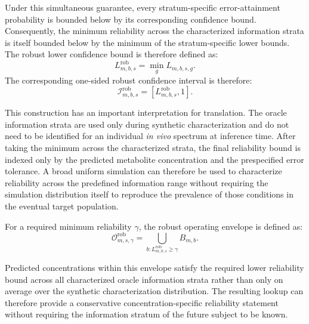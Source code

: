 Under this simultaneous guarantee, every stratum-specific error-attainment probability is bounded below by its corresponding confidence bound. Consequently, the minimum reliability across the characterized information strata is itself bounded below by the minimum of the stratum-specific lower bounds. The robust lower confidence bound is therefore defined as:
\begin{equation}
    L_{m,b,s}^{\mathrm{rob}} = \min_g L_{m,b,s,g}.
\end{equation}
The corresponding one-sided robust confidence interval is therefore:
\begin{equation}
    \mathcal I_{m,b,s}^{\mathrm{rob}} = \left[ L_{m,b,s}^{\mathrm{rob}}, 1 \right].
\end{equation}

This construction has an important interpretation for translation. The oracle information strata are used only during synthetic characterization and do not need to be identified for an individual \textit{in vivo} spectrum at inference time. After taking the minimum across the characterized strata, the final reliability bound is indexed only by the predicted metabolite concentration and the prespecified error tolerance. A broad uniform simulation can therefore be used to characterize reliability across the predefined information range without requiring the simulation distribution itself to reproduce the prevalence of those conditions in the eventual target population.

For a required minimum reliability $\gamma$, the robust operating envelope is defined as:
\begin{equation}
    \mathcal{O}_{m,s,\gamma}^{\mathrm{rob}} = \bigcup_{ b: L_{m,b,s}^{\mathrm{rob}} \geq \gamma } B_{m,b}.
\end{equation}

Predicted concentrations within this envelope satisfy the required lower reliability bound across all characterized oracle information strata rather than only on average over the synthetic characterization distribution. The resulting lookup can therefore provide a conservative concentration-specific reliability statement without requiring the information stratum of the future subject to be known.


